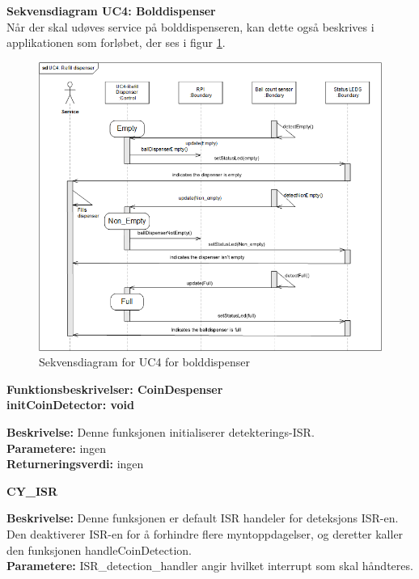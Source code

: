 \documentclass[Arkitektur/System_main.tex]{subfiles}
\begin{document}
\textbf{Sekvensdiagram UC4: Bolddispenser}\\
Når der skal udøves service på bolddispenseren, kan dette også beskrives i applikationen som forløbet, der ses i figur \ref{fig:seq_uc4_balldispenser}.
\begin{figure}[H]
    \centering
    \includegraphics[width=\textwidth]{Arkitektur/Softwarearkitektur/Applikationsmodel/BallDispenser/graphicsBallDispenser/ApplikationsmodelBolddispensersequc4.png}
    \caption{Sekvensdiagram for UC4 for bolddispenser}
    \label{fig:seq_uc4_balldispenser}
\end{figure}
\newpage
{\large\textbf{Funktionsbeskrivelser: CoinDespenser}}\\[0.2cm]

\textbf {initCoinDetector: void}
\begin{adjustwidth}{1cm}{0pt}
\textbf {Beskrivelse:} Denne funksjonen initialiserer detekterings-ISR. \\ [0.2cm]
\textbf {Parametere:} ingen \\ [0.2cm]
\textbf {Returneringsverdi:} ingen \\ [0.2cm]
\end{adjustwidth}

\textbf {CY\_ISR}
\begin{adjustwidth}{1cm}{0pt}
\textbf {Beskrivelse:} Denne funksjonen er default ISR handeler for deteksjons ISR-en. Den deaktiverer ISR-en for å forhindre flere myntoppdagelser, og deretter kaller den funksjonen handleCoinDetection. \\ [0.2cm]
\textbf {Parametere:} ISR\_detection\_handler angir hvilket interrupt som skal håndteres. \\ [0.2cm]
\end{adjustwidth}
\end{document}
